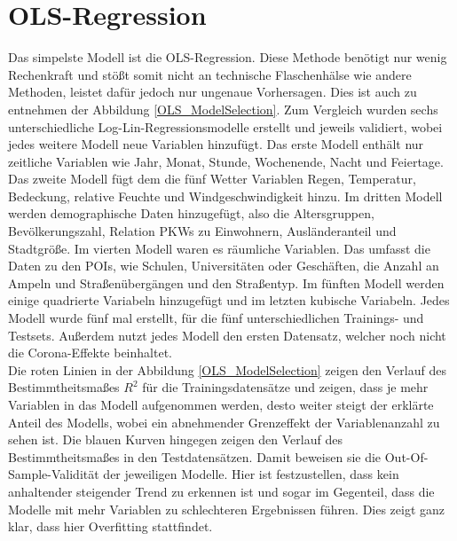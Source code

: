\documentclass[a4paper,12pt]{thesis}
\begin{document}
\section{OLS-Regression}

Das simpelste Modell ist die OLS-Regression. Diese Methode benötigt nur wenig Rechenkraft und stößt somit nicht an technische Flaschenhälse wie andere Methoden, leistet dafür jedoch nur ungenaue Vorhersagen. Dies ist auch zu entnehmen der Abbildung \ref{OLS_ModelSelection}. Zum Vergleich wurden sechs unterschiedliche Log-Lin-Regressionsmodelle erstellt und jeweils validiert, wobei jedes weitere Modell neue Variablen hinzufügt. Das erste Modell enthält nur zeitliche Variablen wie Jahr, Monat, Stunde, Wochenende, Nacht und Feiertage. Das zweite Modell fügt dem die fünf Wetter Variablen Regen, Temperatur, Bedeckung, relative Feuchte und Windgeschwindigkeit hinzu. Im dritten Modell werden demographische Daten hinzugefügt, also die Altersgruppen, Bevölkerungszahl, Relation PKWs zu Einwohnern, Ausländeranteil und Stadtgröße. Im vierten Modell waren es räumliche Variablen. Das umfasst die Daten zu den POIs, wie Schulen, Universitäten oder Geschäften, die Anzahl an Ampeln und Straßenübergängen und den Straßentyp. Im fünften Modell werden einige quadrierte Variabeln hinzugefügt und im letzten kubische Variabeln. Jedes Modell wurde fünf mal erstellt, für die fünf unterschiedlichen Trainings- und Testsets. Außerdem nutzt jedes Modell den ersten Datensatz, welcher noch nicht die Corona-Effekte beinhaltet.\\
Die roten Linien in der Abbildung \ref{OLS_ModelSelection} zeigen den Verlauf des Bestimmtheitsmaßes $R^2$ für die Trainingsdatensätze und zeigen, dass je mehr Variablen in das Modell aufgenommen werden, desto weiter steigt der erklärte Anteil des Modells, wobei ein abnehmender Grenzeffekt der Variablenanzahl zu sehen ist. Die blauen Kurven hingegen zeigen den Verlauf des Bestimmtheitsmaßes in den Testdatensätzen. Damit beweisen sie die Out-Of-Sample-Validität der jeweiligen Modelle. Hier ist festzustellen, dass kein anhaltender steigender Trend zu erkennen ist und sogar im Gegenteil, dass die Modelle mit mehr Variablen zu schlechteren Ergebnissen führen. Dies zeigt ganz klar, dass hier Overfitting stattfindet.\\
\end{document}
